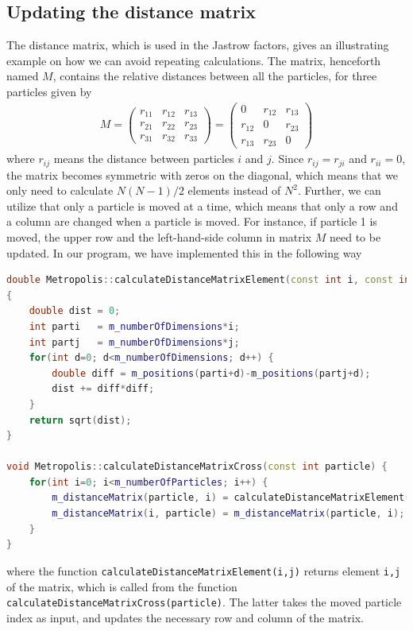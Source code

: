\subsection{Updating the distance matrix} \label{sec:distancematrix}
The distance matrix, which is used in the Jastrow factors, gives an illustrating example on how we can avoid repeating calculations. The matrix, henceforth named $M$, contains the relative distances between all the particles, for three particles given by
\begin{eqnarray}
M=
\begin{pmatrix}
r_{11} & r_{12} & r_{13} \\
r_{21} & r_{22} & r_{23} \\
r_{31} & r_{32} & r_{33}
\end{pmatrix}
=
\begin{pmatrix}
0 & r_{12} & r_{13} \\
r_{12} & 0 & r_{23} \\
r_{13} & r_{23} & 0
\end{pmatrix}
\end{eqnarray}
where $r_{ij}$ means the distance between particles $i$ and $j$. Since $r_{ij}=r_{ji}$ and $r_{ii}=0$, the matrix becomes symmetric with zeros on the diagonal, which means that we only need to calculate $N(N-1)/2$ elements instead of $N^2$. Further, we can utilize that only a particle is moved at a time, which means that only a row and a column are changed when a particle is moved. For instance, if particle 1 is moved, the upper row and the left-hand-side column in matrix $M$ need to be updated. In our program, we have implemented this in the following way
\lstset{basicstyle=\scriptsize}
\begin{lstlisting}[language=c++,caption={Taken from \lstinline{metropolis.cpp}.}]
double Metropolis::calculateDistanceMatrixElement(const int i, const int j) 
{
	double dist = 0;
	int parti   = m_numberOfDimensions*i;
	int partj   = m_numberOfDimensions*j;
	for(int d=0; d<m_numberOfDimensions; d++) {
		double diff = m_positions(parti+d)-m_positions(partj+d);
		dist += diff*diff;
	}
	return sqrt(dist);
}

void Metropolis::calculateDistanceMatrixCross(const int particle) {
	for(int i=0; i<m_numberOfParticles; i++) {
		m_distanceMatrix(particle, i) = calculateDistanceMatrixElement(particle, i);
		m_distanceMatrix(i, particle) = m_distanceMatrix(particle, i);
	}
}
\end{lstlisting}
where the function \lstinline{calculateDistanceMatrixElement(i,j)} returns element \lstinline{i,j} of the matrix, which is called from the function \lstinline{calculateDistanceMatrixCross(particle)}. The latter takes the moved particle index as input, and updates the necessary row and column of the matrix. 

